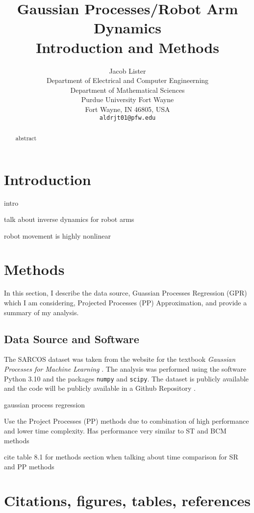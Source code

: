 \documentclass{article}
\title{Gaussian Processes/Robot Arm Dynamics \\ Introduction and Methods}
\author {Jacob Lister                              \\
Department of Electrical and Computer Engineerning \\
Department of Mathematical Sciences                \\
Purdue University Fort Wayne                       \\
Fort Wayne, IN 46805, USA                          \\
\texttt{aldrjt01@pfw.edu}
}
\begin{document}
    \maketitle

    \begin{abstract}
        abstract
    \end{abstract}

    \section{Introduction}

    intro
    
    talk about inverse dynamics for robot arms
    
    robot movement is highly nonlinear
    
    \section{Methods}
    
    In this section, I describe the data source, Guassian Processes Regression (GPR) which I am
    considering, Projected Processes (PP) Approximation, and provide a summary of my analysis.
    
    \subsection{Data Source and Software}
    
    The SARCOS dataset was taken from the website for the textbook 
    \textit{Gaussian Processes for Machine Learning} \citet{sarcos}. The analysis was performed
    using the software Python 3.10 and the packages \texttt{numpy} and \texttt{scipy}. The dataset
    is publicly available and the code will be publicly available in a Github Repository
    \citep{github}.
    
    gaussian process regression
    
    Use the Project Processes (PP) methods due to combination of high performance and lower
    time complexity. Has performance very similar to ST and BCM methods
    
    cite table 8.1 for methods section when talking about time comparison for SR and PP methods

    \section{Citations, figures, tables, references}
\end{document}
